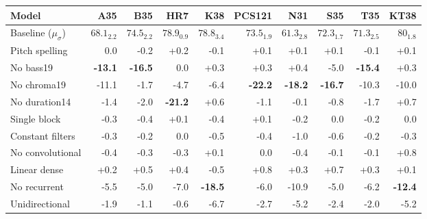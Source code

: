 \begin{tabular}{l|rrrrrrrrr}
Model               & A35            & B35            & HR7            & K38            & PCS121         & N31            & S35            & T35            & KT38           \\ \hline
Baseline ($\mu_\sigma$)     & $68.1_{2.2}$          & $74.5_{2.2}$           & $78.9_{0.9}$           & $78.8_{3.4}$           & $73.5_{1.9}$           & $61.3_{2.8}$           & $72.3_{1.7}$           & $71.3_{2.5}$           & $80_{1.8}$             \\ \hline
Pitch spelling      & 0.0           & -0.2           & +0.2           & -0.1           & +0.1           & +0.1           & +0.1           & -0.1           & +0.1           \\
No \gls{bass19}   & \textbf{-13.1} & \textbf{-16.5} & 0.0           & +0.3           & +0.3           & +0.4           & -5.0             & \textbf{-15.4} & +0.3           \\
No \gls{chroma19} & -11.1          & -1.7           & -4.7           & -6.4           & \textbf{-22.2} & \textbf{-18.2} & \textbf{-16.7} & -10.3          & -10.0            \\
No \gls{duration14}     & -1.4           & -2.0             & \textbf{-21.2} & +0.6           & -1.1           & -0.1           & -0.8           & -1.7           & +0.7           \\
Single block        & -0.3           & -0.4           & +0.1           & -0.4           & +0.1           & -0.2           & 0.0              & -0.2           & 0.0           \\
Constant filters    & -0.3           & -0.2           & 0.0              & -0.5           & -0.4           & -1.0             & -0.6           & -0.2           & -0.3           \\
No convolutional    & -0.4           & -0.3           & -0.3           & +0.1           & 0.0           & -0.4           & -0.1           & -0.1           & +0.8           \\
Linear dense        & +0.2           & +0.5           & +0.4           & -0.5           & +0.8           & +0.3           & +0.7           & +0.3           & +0.1           \\
No recurrent        & -5.5           & -5.0             & -7.0             & \textbf{-18.5} & -6.0             & -10.9          & -5.0             & -6.2           & \textbf{-12.4} \\
Unidirectional      & -1.9           & -1.1           & -0.6           & -6.7           & -2.7           & -5.2           & -2.4           & -2.0             & -5.2          
\end{tabular}
